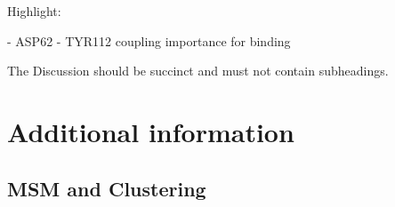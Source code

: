 \documentclass[fleqn,10pt]{wlscirep}
\begin{document}
Highlight:

  - ASP62 - TYR112 coupling importance for binding

The Discussion should be succinct and must not contain subheadings.



%





\section{Additional information}

\subsection{MSM and Clustering}
\end{document}
